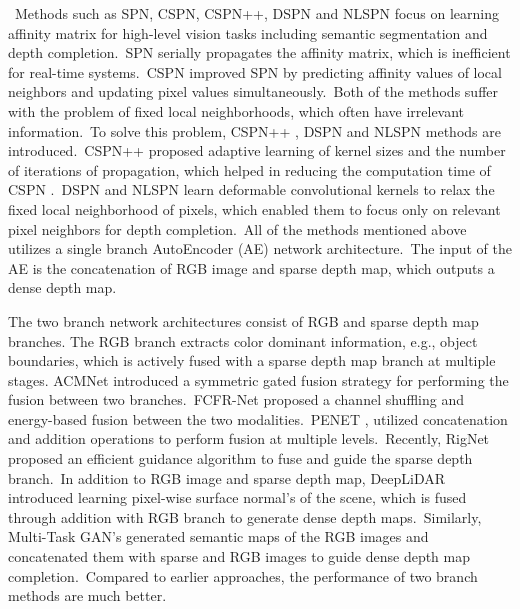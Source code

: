 \documentclass{ieeeaccess}
\begin{document}
~Methods such as SPN\cite{liu2017learning}, CSPN\cite{cheng2018depth}, CSPN++\cite{cheng2020cspn++}, DSPN\cite{dspn} and NLSPN  \cite{park2020non} focus on learning affinity matrix for high-level vision tasks including semantic segmentation and depth completion.~SPN \cite{liu2017learning} serially propagates the affinity matrix, which is inefficient for real-time systems.~CSPN \cite{cheng2018depth} improved SPN \cite{liu2017learning} by predicting affinity values of local neighbors and updating pixel values simultaneously.~Both of the methods suffer with the problem of fixed local neighborhoods, which often have irrelevant information.~To solve this problem, CSPN++ \cite{cheng2020cspn++}, DSPN \cite{dspn} and NLSPN \cite{park2020non} methods are introduced.~CSPN++ \cite{cheng2020cspn++} proposed adaptive learning of kernel sizes and the number of iterations of propagation, which helped in reducing the computation time of CSPN \cite{cheng2018depth}.~DSPN \cite{dspn} and NLSPN \cite{park2020non} learn deformable convolutional kernels to relax the fixed local neighborhood of pixels, which enabled them to focus only on relevant pixel neighbors for depth completion.~All of the methods mentioned above utilizes a single branch AutoEncoder (AE) \cite{liou2014autoencoder} network architecture.~The input of the AE is the concatenation of RGB image and sparse depth map, which outputs a dense depth map.




The two branch network architectures  \cite{Qiu_2019_CVPR,hu2020PENet,yan2021rignet,zhao2021adaptive,liu2021fcfr} consist of RGB and sparse depth map branches. The RGB branch extracts color dominant information, e.g., object boundaries, which is actively fused with a sparse depth map branch at multiple stages.
ACMNet \cite{zhao2021adaptive} introduced a symmetric gated fusion strategy for performing the fusion between two branches.~FCFR-Net proposed a channel shuffling and energy-based fusion between the two modalities.~PENET \cite{hu2020PENet}, utilized concatenation and addition operations to perform fusion at multiple levels.~Recently, RigNet \cite{yan2021rignet} proposed an efficient guidance algorithm to fuse and guide the sparse depth branch.~In addition to RGB image and sparse depth map, DeepLiDAR \cite{Qiu_2019_CVPR} introduced learning pixel-wise surface normal's of the scene, which is fused through addition with RGB branch to generate dense depth maps.~Similarly, Multi-Task GAN's \cite{Multi-TaskGan} generated semantic maps of the RGB images and concatenated them with sparse and RGB images to guide dense depth map completion.~Compared to earlier approaches, the performance of two branch methods are much better. 
\end{document}
